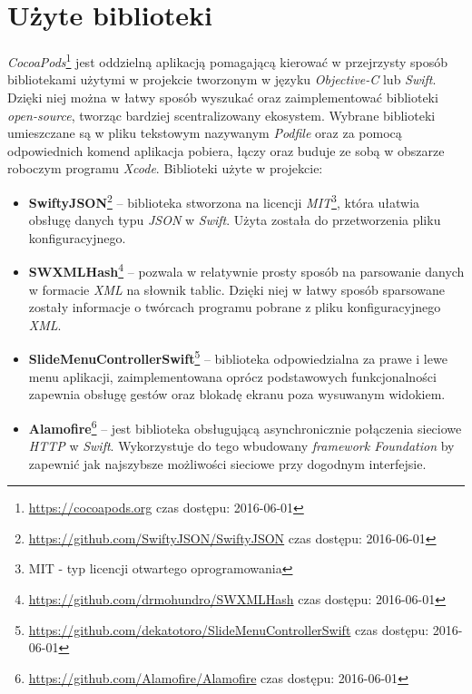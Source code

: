 \documentclass{iiuwb}
\begin{document}
\section{Użyte biblioteki}
\textit{CocoaPods}\footnote{\url{https://cocoapods.org} czas dostępu: 2016-06-01} jest oddzielną aplikacją pomagającą kierować w przejrzysty sposób bibliotekami użytymi w projekcie tworzonym w języku \textit{Objective-C} lub \textit{Swift}. Dzięki niej można w łatwy sposób wyszukać oraz zaimplementować biblioteki \textit{open-source}, tworząc bardziej scentralizowany ekosystem. Wybrane biblioteki umieszczane są w pliku tekstowym nazywanym \textit{Podfile} oraz za pomocą odpowiednich komend aplikacja pobiera, łączy oraz buduje ze sobą w obszarze roboczym programu \textit{Xcode}. Biblioteki użyte w projekcie:
\begin{itemize}
\item \textbf{SwiftyJSON}\footnote{\url{https://github.com/SwiftyJSON/SwiftyJSON} czas dostępu: 2016-06-01} -- biblioteka stworzona na licencji \textit{MIT}\footnote{MIT - typ licencji otwartego oprogramowania}, która ułatwia obsługę danych typu \textit{JSON} w \textit{Swift}. Użyta została do przetworzenia pliku konfiguracyjnego.
\item \textbf{SWXMLHash}\footnote{\url{https://github.com/drmohundro/SWXMLHash} czas dostępu: 2016-06-01} -- pozwala w relatywnie prosty sposób na parsowanie danych w formacie \textit{XML} na słownik tablic. Dzięki niej w łatwy sposób sparsowane zostały informacje o twórcach programu pobrane z pliku konfiguracyjnego \textit{XML}.
\end{itemize}
\newpage
\begin{itemize}
\item \textbf{SlideMenuControllerSwift}\footnote{\url{https://github.com/dekatotoro/SlideMenuControllerSwift} czas dostępu: 2016-06-01} -- biblioteka odpowiedzialna za prawe i lewe menu aplikacji, zaimplementowana oprócz podstawowych funkcjonalności zapewnia obsługę gestów oraz blokadę ekranu poza wysuwanym widokiem.
\item \textbf{Alamofire}\footnote{\url{https://github.com/Alamofire/Alamofire} czas dostępu: 2016-06-01} -- jest biblioteka obsługującą asynchronicznie połączenia sieciowe \textit{HTTP} w \textit{Swift}. Wykorzystuje do tego wbudowany \textit{framework Foundation} by zapewnić jak najszybsze możliwości sieciowe przy dogodnym interfejsie.
\end{itemize}
\end{document}
